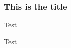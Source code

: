 \documentclass[t]{beamer}
\begin{document}
\begin{frame}
\frametitle{This is the title}
Test
\end{frame}

\begin{frame}
Test
\end{frame}
\end{document}
